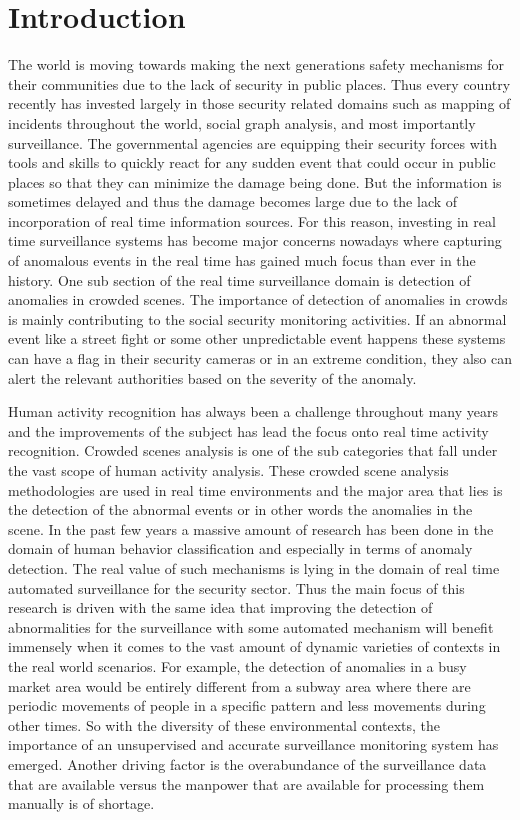 \documentclass[a4paper,12pt]{report}
\begin{document}
\newpage
\renewcommand{\thepage}{\arabic{page}}%
\setcounter{page}{1}

\chapter{Introduction}
\newpage
The world is moving towards making the next generations safety mechanisms for their communities due to the lack of security in public places. Thus every country recently has invested largely in those security related domains such as mapping of incidents throughout the world, social graph analysis, and most importantly surveillance. The governmental agencies are equipping their security forces with tools and skills to quickly react for any sudden event that could occur in public places so that they can minimize the damage being done. But the information is sometimes delayed and thus the damage becomes large due to the lack of incorporation of real time information sources. For this reason, investing in real time surveillance systems has become major concerns nowadays where capturing of anomalous events in the real time has gained much focus than ever in the history. One sub section of the real time surveillance domain is detection of anomalies in crowded scenes. The importance of detection of anomalies in crowds is mainly contributing to the social security monitoring activities. If an abnormal event like a street fight or some other unpredictable event happens these systems can have a flag in their security cameras or in an extreme condition, they also can alert the relevant authorities based on the severity of the anomaly.  

Human activity recognition has always been a challenge throughout many years and the improvements of the subject has lead the focus onto real time activity recognition. Crowded scenes analysis is one of the sub categories that fall under the vast scope of human activity analysis. These crowded scene analysis methodologies are used in real time environments and the major area that lies is the detection of the abnormal events or in other words the anomalies in the scene. In the past few years a massive amount of research has been done in the domain of human behavior classification and especially in terms of anomaly detection.  The real value of such mechanisms is lying in the domain of real time automated surveillance for the security sector. Thus the main focus of this research is driven with the same idea that improving the detection of abnormalities for the surveillance with some automated mechanism will benefit immensely when it comes to the vast amount of dynamic varieties of contexts in the real world scenarios. For example, the detection of anomalies in a busy market area would be entirely different from a subway area where there are periodic movements of people in a specific pattern and less movements during other times. So with the diversity of these environmental contexts, the importance of an unsupervised and accurate surveillance monitoring system has emerged.  Another driving factor is the overabundance of the surveillance data that are available versus the manpower that are available for processing them manually is of shortage. 
\end{document}
